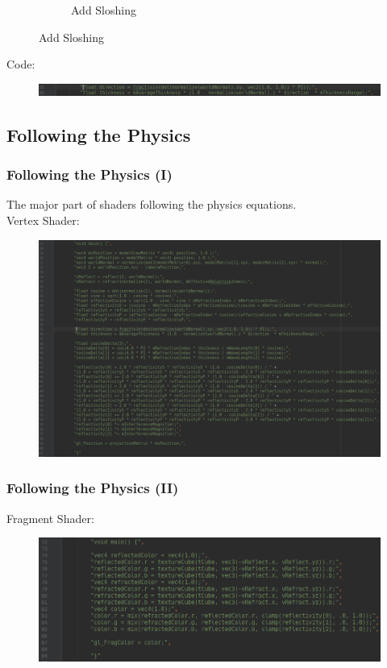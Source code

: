 \documentclass{beamer}
\begin{document}
\begin{frame}
\begin{figure}
\begin{subfigure}[b]{0.2\textwidth}
		\caption{\footnotesize Add Sloshing}
	\end{subfigure}
	\end{figure}
	Code:
	\begin{figure}
		\centering
		\includegraphics[width=1.0\linewidth]{thickness_code.png}
	\end{figure}
\end{frame}


\subsection{Following the Physics}

\begin{frame}
	\frametitle{Following the Physics (I)}
	The major part of shaders following the physics equations.\\
	Vertex Shader:
	\begin{figure}
		\centering
		\includegraphics[width=0.8\linewidth]{vertex_shader.png}
	\end{figure}
\end{frame}


\begin{frame}
	\frametitle{Following the Physics (II)}
	Fragment Shader:
	\begin{figure}
		\centering
		\includegraphics[width=0.8\linewidth]{fragment_shader.png}
	\end{figure}
\end{frame}
\end{document}
